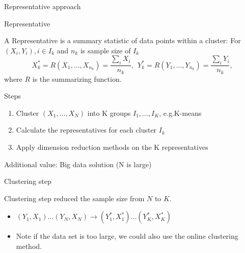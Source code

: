 \documentclass[ignorenonframetext,]{beamer}
\providecommand{\tightlist}{%
  \setlength{\itemsep}{0pt}\setlength{\parskip}{0pt}}
\begin{document}
\begin{frame}{Representative approach}

\begin{block}{Representative}

A Representative is a summary statistic of data points within a cluster:
For \((X_i, Y_i), i \in I_k\) and \(n_k\) is sample size of \(I_k\) \[
  X^*_k = R(X_{1}, \dots, X_{n_k}) = \frac{\sum_i X_i}{n_k},~~ Y^*_k = R(Y_{1}, \dots, Y_{n_k}) = \frac{\sum_i Y_i}{n_k},
\] where \(R\) is the summarizing function.

\end{block}

\begin{block}{Steps}

\begin{enumerate}
\def\labelenumi{\arabic{enumi}.}
\tightlist
\item
  Cluster \((X_1, \dots,X_N)\) into K groups \(I_1, \dots, I_K\),
  e.g.K-means
\item
  Calculate the representatives for each cluster \(I_k\)
\item
  Apply dimension reduction methods on the K representatives
\end{enumerate}

\end{block}

\end{frame}

\begin{frame}{Additional value: Big data solution (N is large)}

\begin{block}{Clustering step}

Clustering step reduced the sample size from \(N\) to \(K\).

\begin{itemize}
\item
  \((Y_1,X_1) \dots (Y_N,X_N) \to (Y^*_{1},X^*_{1}) \dots (Y^*_K,X^*_K)\)
\item
  Note if the data set is too large, we could also use the online
  clustering method.
\end{itemize}

\end{block}

\end{frame}
\end{document}
